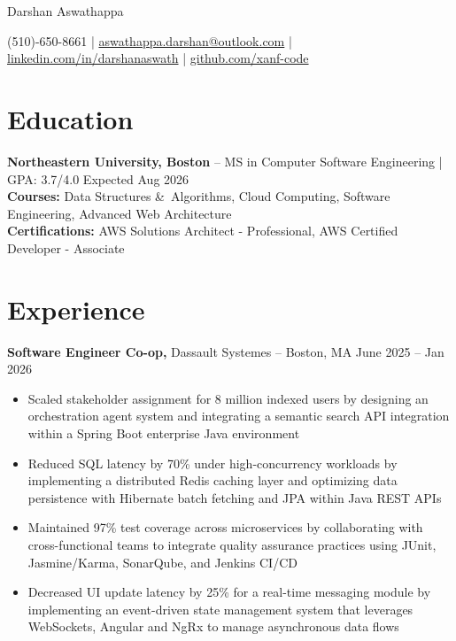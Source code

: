 \documentclass[11pt]{article}       %
\begin{document}
\centerline{\Huge Darshan Aswathappa}

\vspace{5pt}

\centerline{(510)-650-8661 | \href{mailto:aswathappa.darshan@outlook.com}{aswathappa.darshan@outlook.com} | \href{https://www.linkedin.com/in/darshanaswath/}{linkedin.com/in/darshanaswath} | \href{https://github.com/xanf-code}{github.com/xanf-code}}

\vspace{-10pt}

\section*{Education}
\textbf{Northeastern University, Boston} -- MS in Computer Software Engineering | GPA: 3.7/4.0 
\hfill Expected Aug 2026 \\
\vspace{3px}
\textbf{Courses:} Data Structures \&\ Algorithms, Cloud Computing, Software Engineering, Advanced Web Architecture \\
\vspace{3px}
\textbf{Certifications:} AWS Solutions Architect - Professional, AWS Certified Developer - Associate
\vspace{-6.5pt}

\section*{Experience}

\textbf{Software Engineer Co-op,} {Dassault Systemes} -- Boston, MA \hfill June 2025 -- Jan 2026 \\
\vspace{-9pt}
\begin{itemize}
  \item Scaled stakeholder assignment for 8 million indexed users by designing an orchestration agent system and integrating a semantic search API integration within a Spring Boot enterprise Java environment
  \item Reduced SQL latency by 70\% under high-concurrency workloads by implementing a distributed Redis caching layer and optimizing data persistence with Hibernate batch fetching and JPA within Java REST APIs
  \item Maintained 97\% test coverage across microservices by collaborating with cross-functional teams to integrate quality assurance practices using JUnit, Jasmine/Karma, SonarQube, and Jenkins CI/CD
  \item Decreased UI update latency by 25\% for a real-time messaging module by implementing an event-driven state management system that leverages WebSockets, Angular and NgRx to manage asynchronous data flows
\end{itemize}
\end{document}

